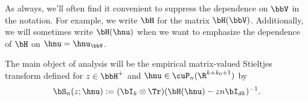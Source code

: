 %

As always, we'll often find it convenient to suppress the dependence on $\bbV$ in the notation. For example, we write $\bH$ for the matrix 
$\bH(\bbV)$.
Additionally, we will sometimes write $\bH(\hnu)$ when we want to emphasize the dependence of $\bH$ on $\hnu = \hnu_{\bbV}$.

The main object of analysis will be the empirical matrix-valued Stieltjes transform defined for $z\in \bbH^+$ and $\hnu \in\cuP_n(\R^{k+k_0+1})$ by
\begin{equation}
\label{eq:Sn_def}
\bS_n(z;\hnu) :=  (\bI_k \otimes \Tr)(\bH(\hnu) - z n \bI_{dk})^{-1}.
\end{equation}


